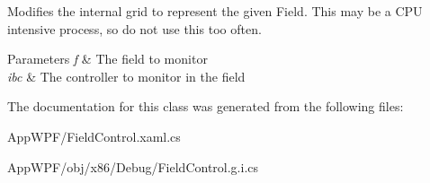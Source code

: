 Modifies the internal grid to represent the given Field. This may be a C\-P\-U intensive process, so do not use this too often.


\begin{DoxyParams}{Parameters}
{\em f} & The field to monitor\\
\hline
{\em ibc} & The controller to monitor in the field\\
\hline
\end{DoxyParams}


The documentation for this class was generated from the following files\-:\begin{DoxyCompactItemize}
\item 
App\-W\-P\-F/Field\-Control.\-xaml.\-cs\item 
App\-W\-P\-F/obj/x86/\-Debug/Field\-Control.\-g.\-i.\-cs\end{DoxyCompactItemize}

